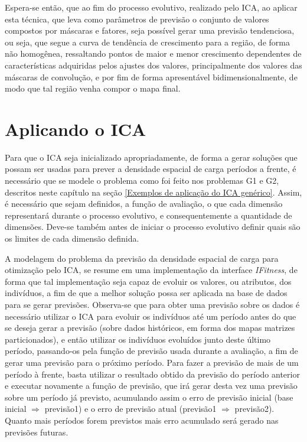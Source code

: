 Espera-se então, que ao fim do processo evolutivo, realizado pelo ICA, ao aplicar esta técnica, que leva como parâmetros de previsão o conjunto de valores compostos por máscaras e fatores, seja possível gerar uma previsão tendenciosa, ou seja, que segue a curva de tendência de crescimento para a região, de forma não homogênea, ressaltando pontos de maior e menor crescimento dependentes de características adquiridas pelos ajustes dos valores, principalmente dos valores das máscaras de convolução, e por fim de forma apresentável bidimensionalmente, de modo que tal região venha compor o mapa final. 








\section{Aplicando o ICA}
\label{Aplicando o ICA}

Para que o ICA seja inicializado apropriadamente, de forma a gerar soluções que possam ser usadas para prever a densidade espacial de carga períodos a frente, é necessário que se modele o problema como foi feito nos problemas G1 e G2, descritos neste capítulo na seção \ref{Exemplos de aplicação do ICA genérico}. Assim, é necessário que sejam definidos, a função de avaliação, o que cada dimensão representará durante o processo evolutivo, e consequentemente a quantidade de dimensões. Deve-se também antes de iniciar o processo evolutivo definir quais são os limites de cada dimensão definida.

A modelagem do problema da previsão da densidade espacial de carga para otimização pelo ICA, se resume em uma implementação da interface \emph{IFitness}, de forma que tal implementação seja capaz de evoluir os valores, ou atributos, dos indivíduos, a fim de que a melhor solução possa ser aplicada na base de dados para se gerar previsões. Observa-se que para obter uma previsão sobre os dados é necessário utilizar o ICA para evoluir os indivíduos até um período antes do que se deseja gerar a previsão (sobre dados históricos, em forma dos mapas matrizes particionados), e então utilizar os indivíduos evoluídos junto deste último período, passando-os pela função de previsão usada durante a avaliação, a fim de gerar uma previsão para o próximo período. Para fazer a previsão de mais de um período à frente, basta utilizar o resultado obtido da previsão do período anterior e executar novamente a função de previsão, que irá gerar desta vez uma previsão sobre um período já previsto, acumulando assim o erro de previsão inicial (base inicial \(\Rightarrow\) previsão1) e o erro de previsão atual (previsão1 \(\Rightarrow\) previsão2). Quanto mais períodos forem previstos mais erro acumulado será gerado nas previsões futuras.

